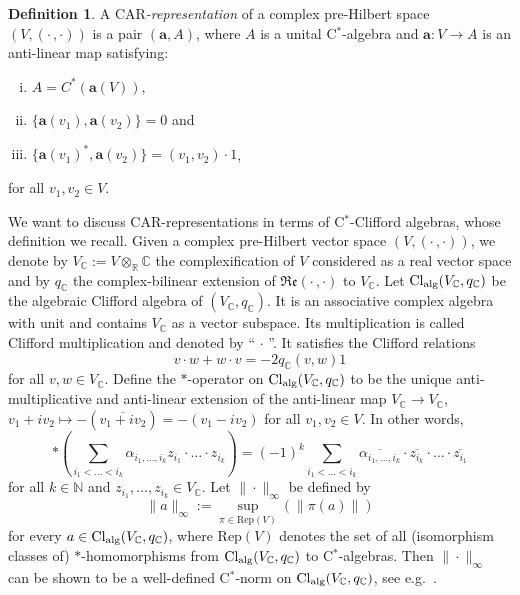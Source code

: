 \documentclass[a4paper,11pt]{amsart}
\theoremstyle{definition}
\newtheorem{definition}[thm]{Definition}
\begin{document}
\begin{definition}\label{def-CAR}
A \emph{$\mathrm{CAR}$-representation} of a complex pre-Hilbert space $(V,(\cdot\,,\cdot))$ is a pair $({\mathbf{a}},A)$, where $A$ is a unital {\mbox{C$^*$}}-algebra and ${\mathbf{a}}:V\to A$ is an anti-linear map satisfying:
\begin{enumerate}[(i)]
\item\label{def-CAR:1} $A=C^*({\mathbf{a}}(V))$,
\item\label{def-CAR:2} $\{{\mathbf{a}}(v_1),{\mathbf{a}}(v_2)\}=0$ and
\item\label{def-CAR:3} $\{{\mathbf{a}}(v_1)^*,{\mathbf{a}}(v_2)\}=(v_1,v_2)\cdot 1$,
\end{enumerate}
for all $v_1,v_2\in V$.
\end{definition}

We want to discuss CAR-representations in terms of {\mbox{C$^*$}}-Clifford algebras, whose definition we recall.
Given a complex pre-Hilbert vector space $(V,(\cdot\,,\cdot))$, we denote by $V_{\mathbb{C}}:=V\otimes_{\mathbb{R}}{\mathbb{C}}$ the complexification of $V$ considered as a real vector space and by $q_{\mathbb{C}}$ the complex-bilinear extension of ${\mathfrak{Re}}(\cdot\,,\cdot)$ to $V_{\mathbb{C}}$.
Let $\mathrm{Cl}_{\rm alg}(V_{\mathbb{C}},q_{\mathbb{C}})$ be the algebraic Clifford algebra of  $(V_{\mathbb{C}},q_{\mathbb{C}})$.
It is an associative complex algebra with unit and contains $V_{\mathbb{C}}$ as a vector subspace.
Its multiplication is called Clifford multiplication and denoted by ``$\,\cdot\,$''. 
It satisfies the Clifford relations
\begin{equation} 
v\cdot w+w\cdot v=-2q_{\mathbb{C}}(v,w)1
\label{eq:CliffRel}
\end{equation}
for all $v,w\in V_{\mathbb{C}}$.
Define the $*$-operator on $\mathrm{Cl}_{\rm alg}(V_{\mathbb{C}},q_{\mathbb{C}})$ to be the unique anti-multiplicative and anti-linear extension of the anti-linear map $V_{\mathbb{C}}\rightarrow V_{\mathbb{C}}$, $v_1+iv_2\mapsto -(\overline{v_1+iv_2})=-(v_1-iv_2)$ for all $v_1,v_2\in V$.
In other words,
\[
*(\sum_{i_1<\ldots<i_k}\alpha_{i_1,\ldots,i_k}z_{i_1}\cdot\ldots\cdot z_{i_k})
=
(-1)^k\sum_{i_1<\ldots<i_k}\overline{\alpha_{i_1,\ldots,i_k}}\cdot\overline{z_{i_k}}\cdot\ldots\cdot \overline{z_{i_1}}
\]
for all $k\in\mathbb{N}$ and $z_{i_1},\ldots,z_{i_k}\in V_{\mathbb{C}}$.
Let $\|\cdot\|_\infty$ be defined by 
\[ \|a\|_\infty:=\sup_{\pi\in\mathrm{Rep}(V)}(\|\pi(a)\|)\]
for every $a\in\mathrm{Cl}_{\rm alg}(V_{\mathbb{C}},q_{\mathbb{C}})$, where $\mathrm{Rep}(V)$ denotes the set of all (isomorphism classes of) $*$-homomorphisms from $\mathrm{Cl}_{\rm alg}(V_{\mathbb{C}},q_{\mathbb{C}})$ to {\mbox{C$^*$}}-algebras.
Then $\|\cdot\|_\infty$ can be shown to be a well-defined {\mbox{C$^*$}}-norm on $\mathrm{Cl}_{\rm alg}(V_{\mathbb{C}},q_{\mathbb{C}})$, see e.g.\ \cite[Sec.~1.2]{PR}.
\end{document}
